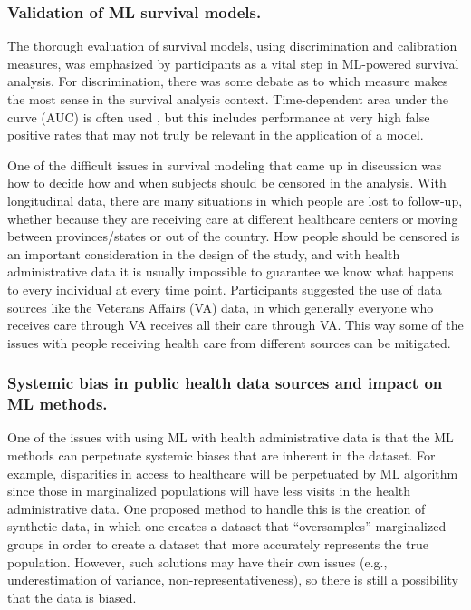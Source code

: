 \subsubsection{Validation of ML survival models.}  
The thorough evaluation of survival models, using discrimination and calibration measures, was emphasized by participants as a vital step in ML-powered survival analysis. For discrimination, there was some debate as to which measure makes the most sense in the survival analysis context. Time-dependent area under the curve (AUC) is often used \citep{kamarudin2017time}, but this includes performance at very high false positive rates that may not truly be relevant in the application of a model. 

One of the difficult issues in survival modeling that came up in discussion was how to decide how and when subjects should be censored in the analysis. With longitudinal data, there are many situations in which people are lost to follow-up, whether because they are receiving care at different healthcare centers or moving between provinces/states or out of the country. How people should be censored is an important consideration in the design of the study, and with health administrative data it is usually impossible to guarantee we know what happens to every individual at every time point. Participants suggested the use of data sources like the Veterans Affairs (VA) data, in which generally everyone who receives care through VA receives all their care through VA. This way some of the issues with people receiving health care from different sources can be mitigated.

\subsubsection{Systemic bias in public health data sources and impact on ML methods.}  
One of the issues with using ML with health administrative data is that the ML methods can perpetuate systemic biases that are inherent in the dataset. For example, disparities in access to healthcare will be perpetuated by ML algorithm since those in marginalized populations will have less visits in the health administrative data. One proposed method to handle this is the creation of synthetic data, in which one creates a dataset that “oversamples” marginalized groups in order to create a dataset that more accurately represents the true population. However, such solutions may have their own issues (e.g., underestimation of variance, non-representativeness), so there is still a possibility that the data is biased.

